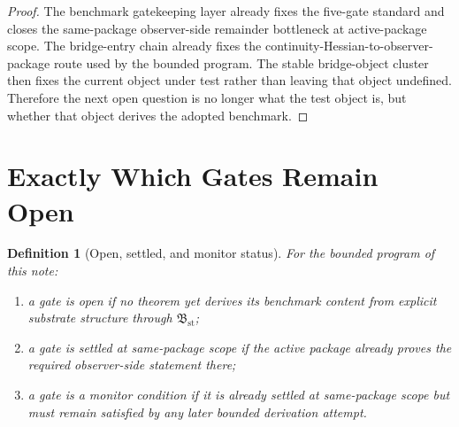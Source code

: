 \documentclass[11pt]{article}
\newcommand{\StableBridgeObject}{\mathfrak B_{\mathrm{st}}}
\newtheorem{definition}{Definition}
\begin{document}
\begin{proof}
The benchmark gatekeeping layer already fixes the five-gate standard and closes the same-package observer-side remainder bottleneck at active-package scope. The bridge-entry chain already fixes the continuity-Hessian-to-observer-package route used by the bounded program. The stable bridge-object cluster then fixes the current object under test rather than leaving that object undefined. Therefore the next open question is no longer what the test object is, but whether that object derives the adopted benchmark.
\end{proof}

\section{Exactly Which Gates Remain Open}

\begin{definition}[Open, settled, and monitor status]
For the bounded program of this note:
\begin{enumerate}
    \item a gate is \emph{open} if no theorem yet derives its benchmark content from explicit substrate structure through \(\StableBridgeObject\);
    \item a gate is \emph{settled at same-package scope} if the active package already proves the required observer-side statement there;
    \item a gate is a \emph{monitor condition} if it is already settled at same-package scope but must remain satisfied by any later bounded derivation attempt.
\end{enumerate}
\end{definition}
\end{document}
